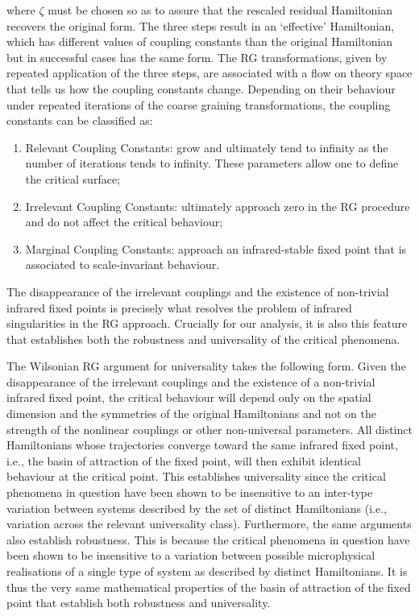 \documentclass[12pt,english]{article}
\numberwithin{equation}{section}
\begin{document}
where $\zeta$ must be chosen so as to assure that the rescaled residual Hamiltonian recovers the original form.   The three steps result in an `effective' Hamiltonian, which has different values of coupling constants than the original Hamiltonian but in successful cases has the same form. The RG transformations, given by repeated application of the three steps, are associated with a flow on theory space that  tells us how the coupling constants change. Depending on their behaviour under repeated iterations of the coarse graining transformations, the coupling constants can be classified as:  
\begin{enumerate}  
\item Relevant Coupling Constants: grow and ultimately tend to infinity as the number of iterations tends to infinity. These parameters allow one to define the critical surface;  
\item   Irrelevant Coupling Constants: ultimately approach zero in the RG procedure and do not affect the critical behaviour;  
\item  Marginal Coupling Constants: approach an infrared-stable fixed point that is associated to scale-invariant behaviour.    
\end{enumerate}  
The disappearance of the irrelevant couplings and the existence of non-trivial infrared fixed points is precisely what resolves the problem of infrared singularities in the RG approach. Crucially for our analysis, it is also this feature that establishes both the robustness and universality of the critical phenomena.   

The Wilsonian RG argument for universality takes the following form. Given the disappearance of the irrelevant couplings and the existence of a non-trivial infrared fixed point, the critical behaviour will depend only on the spatial dimension and the symmetries of the original Hamiltonians and not on the strength of the nonlinear couplings or other non-universal parameters. All distinct Hamiltonians whose trajectories converge toward the same infrared fixed point, i.e., the basin of attraction of the fixed point, will then exhibit identical behaviour at the critical point. This establishes universality since the critical phenomena in question have been shown to be insensitive to an inter-type variation between systems described by the set of distinct Hamiltonians (i.e., variation across the relevant universality class).  Furthermore, the same arguments also establish robustness. This is because the critical phenomena in question have been shown to be insensitive to a variation between possible microphysical realisations of a single type of system as described by distinct Hamiltonians. It is thus the very same mathematical properties of the basin of attraction of the fixed point that establish both robustness and universality. 
\end{document}
